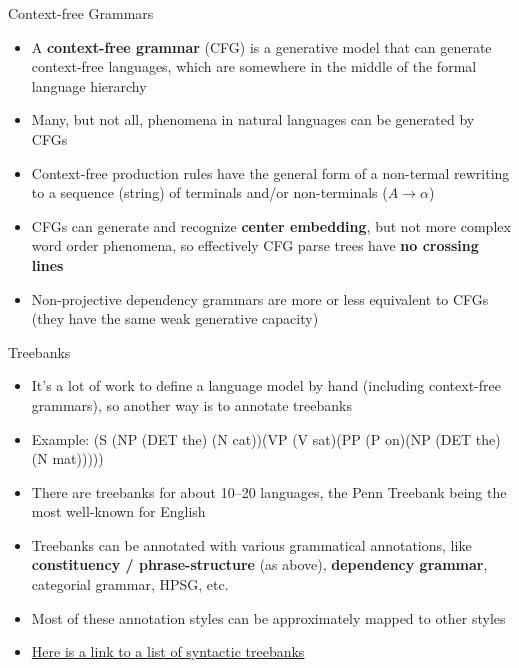 \documentclass[xcolor=pdftex,x11names,table,hyperref]{beamer}
\newcommand{\detail}[1]{{\color{lightgrey}\small{}#1}}
\begin{document}
\begin{frame}{Context-free Grammars}
\begin{itemize}
	\item A \textbf{context-free grammar} (CFG) is a generative model that can generate context-free languages, which are somewhere in the middle of the formal language hierarchy
	\item Many, but not all, phenomena in natural languages can be generated by CFGs
	\pause
	\item Context-free production rules have the general form of a non-termal rewriting to a sequence (string) of terminals and/or non-terminals \detail{($A \rightarrow \alpha$)}
	\pause
	\item CFGs can generate and recognize \textbf{center embedding}, but not more complex word order phenomena, so effectively CFG parse trees have \textbf{no crossing lines}
	\pause
	\item Non-projective dependency grammars are more or less equivalent to CFGs \detail{(they have the same weak generative capacity)}
\end{itemize}
\end{frame}


\begin{frame}{Treebanks}
\begin{itemize}
	\item It's a lot of work to define a language model by hand (including context-free grammars), so another way is to annotate treebanks
	\item Example:
			(S (NP (DET the) (N cat))(VP (V sat)(PP (P on)(NP (DET the) (N mat)))))
	\pause
	\item There are treebanks for about 10--20 languages, the Penn Treebank being the most well-known for English
	\pause
	\item Treebanks can be annotated with various grammatical annotations, like \textbf{constituency / phrase-structure} (as above), \textbf{dependency grammar}, categorial grammar, HPSG, etc.
	\item Most of these annotation styles can be approximately mapped to other styles
	\pause
	\item \href{https://en.wikipedia.org/wiki/Treebank\#Syntactic_treebanks}{Here is a link to a list of syntactic treebanks} 
\end{itemize}
\end{frame}
\end{document}

